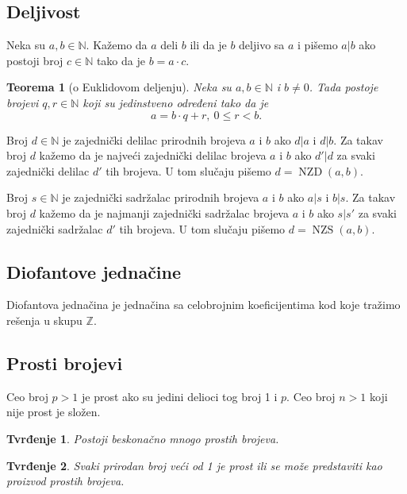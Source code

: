\documentclass[12p,14paper]{article}
\DeclareMathOperator{\nzd}{NZD}
\DeclareMathOperator{\nzs}{NZS}
\newtheorem*{theorem}{Teorema}
\newtheorem*{prop}{Tvrđenje}
\begin{document}
\begin{multicols}{2}
\subsection{Deljivost}

    Neka su $a, b \in \mathbb{N}$. Kažemo da $a$ deli $b$ ili da je $b$ 
    deljivo sa $a$ i pišemo $a | b$ ako postoji broj $c \in \mathbb{N}$ tako 
    da je $b = a \cdot c$.

    \begin{theorem}[o Euklidovom deljenju]
        Neka su $a, b \in \mathbb{N}$ i $b \neq 0$. Tada postoje brojevi 
        $q, r \in \mathbb{N}$ koji su jedinstveno određeni tako da je 
        \[a = b \cdot q + r,\ 0 \leq r < b.\]
    \end{theorem}

    Broj $d \in \mathbb{N}$ je zajednički delilac prirodnih brojeva $a$ i $b$ 
    ako $d | a$ i $d | b$. Za takav broj $d$ kažemo da je najveći zajednički 
    delilac brojeva $a$ i $b$ ako $d' | d$ za svaki zajednički delilac $d'$ 
    tih brojeva. U tom slučaju pišemo $d = \nzd (a, b)$.

    Broj $s \in \mathbb{N}$ je zajednički sadržalac prirodnih brojeva $a$ i
    $b$ ako $a | s$ i $b | s$. Za takav broj $d$ kažemo da je najmanji 
    zajednički sadržalac brojeva $a$ i $b$ ako $s | s'$ za svaki zajednički 
    sadržalac $d'$ tih brojeva. U tom slučaju pišemo $d = \nzs (a, b)$.

\subsection{Diofantove jednačine}

    Diofantova jednačina je jednačina sa celobrojnim koeficijentima kod koje 
    tražimo rešenja u skupu $\mathbb{Z}$.

\subsection{Prosti brojevi}

    Ceo broj $p > 1$ je prost ako su jedini delioci tog broj 1 i $p$.
    Ceo broj $n > 1$ koji nije prost je složen.

    \begin{prop}
        Postoji beskonačno mnogo prostih brojeva.
    \end{prop}

    \begin{prop}
        Svaki prirodan broj veći od 1 je prost ili se može predstaviti kao 
        proizvod prostih brojeva.
    \end{prop}


\end{multicols}
\end{document}
